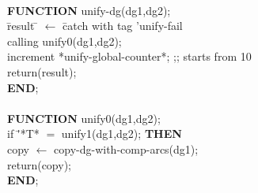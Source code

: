 \vspace*{4mm}
\begin{footnotesize}
  \\ 
\vspace*{-3mm}
\begin{tabbing}
{\bf FUNCTION} unify-dg(dg1,dg2);   \\
\hspace*{2mm} \= result \= $\leftarrow$ \= catch with tag 'unify-fail
 \\
 \>        \>    \> calling unify0(dg1,dg2);  \\
 \> increment *unify-global-counter*;   ;; starts from 10
\footnotemark \\
 \>return(result); \\
{\bf END}; \\ \\

{\bf FUNCTION} unify0(dg1,dg2); \\
 \> if \= '*T* $=$  unify1(dg1,dg2);  {\bf THEN} \\
 \>    \> copy $\leftarrow$ copy-dg-with-comp-arcs(dg1); \\
 \>    \>  return(copy); \\
 {\bf END}; \\ \\





\end{tabbing}
\end{footnotesize}
